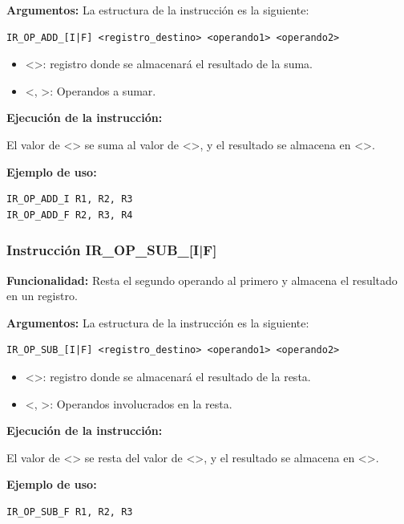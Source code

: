 \noindent
\textbf{Argumentos:} La estructura de la instrucción es la siguiente:
\begin{verbatim}
IR_OP_ADD_[I|F] <registro_destino> <operando1> <operando2>
\end{verbatim}
\begin{itemize}
    \item <>: registro donde se almacenará el resultado de la suma.
    \item <, >: Operandos a sumar.
\end{itemize}

\noindent
\textbf{Ejecución de la instrucción:}


\noindent
El valor de <> se suma al valor de <>, y el resultado se almacena en <>.


\noindent
\textbf{Ejemplo de uso:}
\begin{verbatim}
IR_OP_ADD_I R1, R2, R3
IR_OP_ADD_F R2, R3, R4
\end{verbatim}

\subsubsection{Instrucción IR\_OP\_SUB\_[I|F]}\label{subsubsec:IR_OP_SUB}
\noindent
\textbf{Funcionalidad:} Resta el segundo operando al primero y almacena el resultado en un registro.

\noindent
\textbf{Argumentos:} La estructura de la instrucción es la siguiente:
\begin{verbatim}
IR_OP_SUB_[I|F] <registro_destino> <operando1> <operando2>
\end{verbatim}
\begin{itemize}
    \item <>: registro donde se almacenará el resultado de la resta.
    \item <, >: Operandos involucrados en la resta.
\end{itemize}

\noindent
\textbf{Ejecución de la instrucción:}
\vspace{0.3cm}

\noindent
El valor de <> se resta del valor de <>, y el resultado se almacena en <>.
\vspace{0.3cm}

\noindent
\textbf{Ejemplo de uso:}
\begin{verbatim}
IR_OP_SUB_F R1, R2, R3
\end{verbatim}

